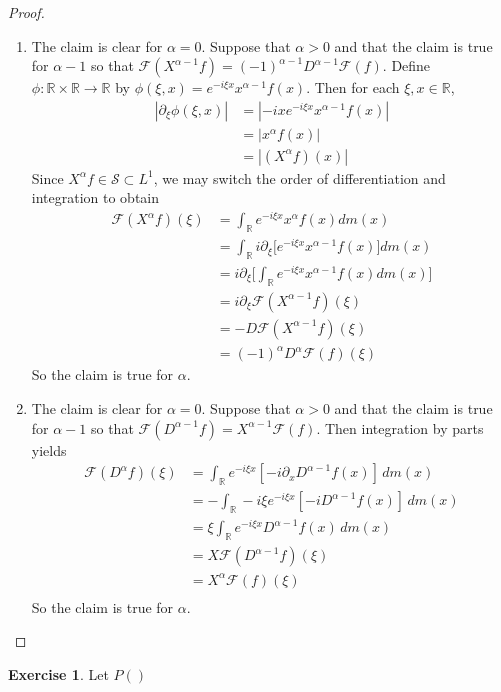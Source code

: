 \documentclass[12pt]{amsart}
\theoremstyle{definition}
\newtheorem{ex}[definition]{Exercise}
\newcommand{\p}{\partial}
\newcommand{\al}{\alpha}
\newcommand{\R}{\mathbb{R}}
\newcommand{\MF}{\mathcal{F}}
\newcommand{\MS}{\mathcal{S}}
\newcommand{\dm}{\, d m}
\begin{document}
	\begin{proof}\
		\begin{enumerate}
			\item The claim is clear for $\al = 0$. Suppose that $\al > 0$ and that the claim is true for $\al -1$ so that $\MF(X^{\al-1}f) = (-1)^{\al-1}D^{\al-1} \MF(f)$. Define $\phi:\R \times \R \rightarrow \R$ by $\phi(\xi, x) = e^{-i\xi x} x^{\al - 1}f(x)$. Then for each $\xi, x \in \R$, 
			\begin{align*}
				|\p_{\xi} \phi(\xi, x)|
				& = |-ix e^{-i\xi x} x^{\al - 1}f(x)| \\
				& = |x^{\al}f(x)| \\
				& = |(X^{\al}f)(x)|
			\end{align*}
			Since $X^{\al}f \in \MS \subset L^1$, we may switch the order of differentiation and integration to obtain 
			\begin{align*}
				\MF(X^{\al}f) (\xi)
				& = \int_{\R} e^{-i\xi x}x^{\al}f(x) dm(x) \\
				& = \int_{\R} i \p_{\xi}\bigg[ e^{-i\xi x}x^{\al-1}f(x) \bigg] dm(x) \\
				& = i \p_{\xi} \bigg[  \int_{\R} e^{-i\xi x}x^{\al-1}f(x) dm(x) \bigg] \\
				& = i \p_{\xi} \MF(X^{\al-1}f) (\xi) \\
				& = -D \MF(X^{\al-1}f)(\xi) \\
				& = (-1)^{\al}D^{\al} \MF(f) (\xi)
			\end{align*}
			So the claim is true for $\al$.
			\item The claim is clear for $\al = 0$. Suppose that $\al > 0$ and that the claim is true for $\al -1$ so that $\MF(D^{\al-1}f) = X^{\al-1} \MF(f)$. Then integration by parts yields 
			\begin{align*}
				\MF(D^{\al}f)(\xi)
				& = \int_{\R} e^{-i \xi x} [-i \p_x D^{\al-1}f(x)] \dm(x) \\
				&= - \int_{\R} -i \xi e^{-i \xi x} [-iD^{\al-1}f(x)] \dm(x) \\
				&= \xi \int_{\R}   e^{-i \xi x} D^{\al-1}f(x) \dm(x) \\
				&= X \MF(D^{\al-1}f)(\xi) \\
				&= X^{\al} \MF(f)(\xi) \\
			\end{align*}
			So the claim is true for $\al$.  
		\end{enumerate}
	\end{proof}

	\begin{ex}
		Let $P()$
	\end{ex}
\end{document}

